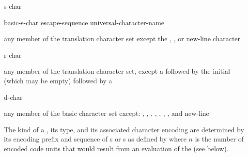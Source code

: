 \begin{bnf}
\br
    s-char 
\end{bnf}

\begin{bnf}
\br
    basic-s-char\br
    escape-sequence\br
    universal-character-name
\end{bnf}

\begin{bnf}
\br
    \textnormal{any member of the translation character set except the ,}\br
    \bnfindent\textnormal{, or new-line character}
\end{bnf}

\begin{bnf}
\br
      \terminal{(}  \terminal{)}  
\end{bnf}

\begin{bnf}
\br
    r-char 
\end{bnf}

\begin{bnf}
\br
    \textnormal{any member of the translation character set, except a  followed by}\br
    \bnfindent\textnormal{the initial  (which may be empty) followed by a }
\end{bnf}

\begin{bnf}
\br
    d-char 
\end{bnf}

\begin{bnf}
\br
    \textnormal{any member of the basic character set except:}\br
    \bnfindent\textnormal{, , , ,}\br
    \bnfindent\textnormal{, , , and new-line}
\end{bnf}

\pnum
{}%
%
%
%
%
%
%
%
The kind of a ,
its type, and
its associated character encoding
are determined by its encoding prefix and sequence of
s or s
as defined by 
where $n$ is the number of encoded code units
that would result from an evaluation of the 
(see below).

